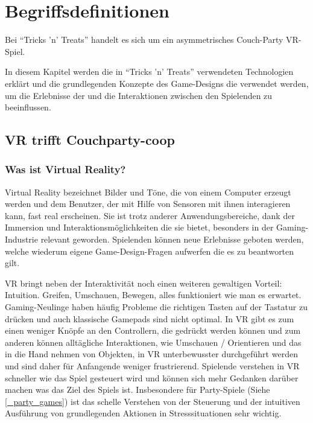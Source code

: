 \chapter{Begriffsdefinitionen}

Bei "`Tricks 'n' Treats"' handelt es sich um ein asymmetrisches Couch-Party VR-Spiel.

In diesem Kapitel werden die in "`Tricks 'n' Treats"' verwendeten Technologien erklärt und die grundlegenden Konzepte des Game-Designs die verwendet werden, um die  Erlebnisse der und die Interaktionen zwischen den Spielenden zu beeinflussen.

\section{VR trifft Couchparty-coop}

\subsection{Was ist Virtual Reality?}

Virtual Reality bezeichnet Bilder und Töne, die von einem Computer erzeugt werden und dem Benutzer, der mit Hilfe von Sensoren mit ihnen interagieren kann, fast real erscheinen\cite{_oxford_dict}. Sie ist trotz anderer Anwendungsbereiche, dank der Immersion und Interaktionsmöglichkeiten die sie bietet, besonders in der Gaming-Industrie relevant geworden\cite{_bitkom_vr}. Spielenden können neue Erlebnisse geboten werden, welche wiederum eigene Game-Design-Fragen aufwerfen die es zu beantworten gilt.

VR bringt neben der Interaktivität noch einen weiteren gewaltigen Vorteil: Intuition. Greifen, Umschauen, Bewegen, alles funktioniert wie man es erwartet. Gaming-Neulinge haben häufig Probleme die richtigen Tasten auf der Tastatur zu drücken und auch klassische Gamepads sind nicht optimal. In VR gibt es zum einen weniger Knöpfe an den Controllern, die gedrückt werden können und zum anderen können alltägliche Interaktionen, wie Umschauen / Orientieren und das in die Hand nehmen von Objekten, in VR unterbewusster durchgeführt werden und sind daher für Anfangende weniger frustrierend. Spielende verstehen in VR schneller wie das Spiel gesteuert wird und können sich mehr Gedanken darüber machen was das Ziel des Spiels ist\cite{_natural_interaction_in__augmented_reality_context}. Insbesondere für Party-Spiele (Siehe \ref{_party_games}) ist das schelle Verstehen von der Steuerung und der intuitiven Ausführung von grundlegenden Aktionen in Stresssituationen sehr wichtig.

